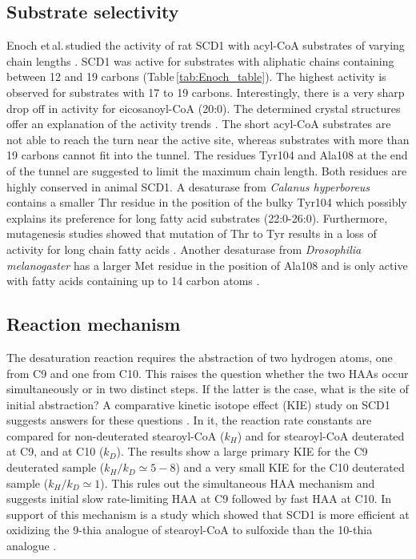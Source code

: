 \subsection{Substrate selectivity}
 Enoch et\,al.\,studied the activity of rat SCD1 with acyl-CoA substrates of varying chain lengths \cite{Enoch1976}. SCD1 was active for substrates with aliphatic chains containing between 12 and 19 carbons (Table\,\ref{tab:Enoch_table}). The highest activity is observed for substrates with 17 to 19 carbons. Interestingly, there is a very sharp drop off in activity for eicosanoyl-CoA (20:0). The determined crystal structures offer an explanation of the activity trends \cite{Bai2015}. The short acyl-CoA substrates are not able to reach the turn near the active site, whereas substrates with more than 19 carbons cannot fit into the tunnel. The residues Tyr104 and Ala108 at the end of the tunnel are suggested to limit the maximum chain length. Both residues are highly conserved in animal SCD1. A desaturase from \textit{Calanus hyperboreus} contains a smaller Thr residue in the position of the bulky Tyr104 which possibly explains its preference for long fatty acid substrates (22:0-26:0). Furthermore, mutagenesis studies showed that mutation of Thr to Tyr results in a loss of activity for long chain fatty acids \cite{Meesapyodsuk2014}. Another desaturase from \textit{Drosophilia melanogaster} has a larger Met residue in the position of Ala108 and is only active with fatty acids containing up to 14 carbon atoms \cite{Dallerac2000}.


\subsection{Reaction mechanism}
The desaturation reaction requires the abstraction of two hydrogen atoms, one from C9 and one from C10. This raises the question whether the two HAAs occur simultaneously or in two distinct steps. If the latter is the case, what is the site of initial abstraction? A comparative kinetic isotope effect (KIE) study on SCD1 suggests answers for these questions \cite{Buist1996}. In it, the reaction rate constants are compared for non-deuterated stearoyl-CoA ($k_H$) and for stearoyl-CoA deuterated at C9, and at C10 ($k_D$). The results show a large primary KIE for the C9 deuterated sample (${k_H}/{k_D}\simeq 5-8$) and a very small KIE for the C10 deuterated sample (${k_H}/{k_D}\simeq 1$). This rules out the simultaneous HAA mechanism and suggests initial slow rate-limiting HAA at C9 followed by fast HAA at C10. In support of this mechanism is a study which showed that SCD1 is more efficient at oxidizing the 9-thia analogue of stearoyl-CoA to sulfoxide than the 10-thia analogue \cite{Buist1992}.

